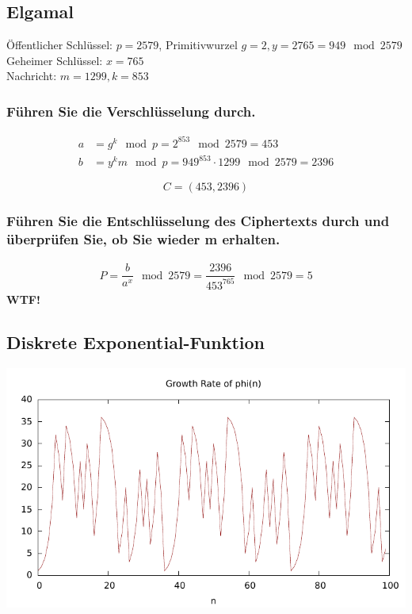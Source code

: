 \subsection{Elgamal}
Öffentlicher Schlüssel: $p = 2579$, Primitivwurzel $g = 2, y = 2765 = 949 \mod 2579$ \\
Geheimer Schlüssel: $x = 765$ \\
Nachricht: $m = 1299, k = 853$\\
\subsubsection{Führen Sie die Verschlüsselung durch.}

\begin{align}
	a&= g^k \mod p = 2^{853} \mod 2579 = 453 \\
	b&= y^km \mod p = 949^{853} \cdot 1299 \mod 2579 =2396
\end{align}

\[ C= (453,2396) \]

\subsubsection{Führen Sie die Entschlüsselung des Ciphertexts durch und überprüfen Sie, ob
Sie wieder m erhalten.}

\begin{align}
	P = \dfrac{b}{a^x} \mod 2579= \dfrac{2396}{453^{765}} \mod 2579 = 5 
\end{align}
\textbf{WTF!}

\subsection{Diskrete Exponential-Funktion}




\includegraphics[scale=1]{eclipse/expofun.pdf}

